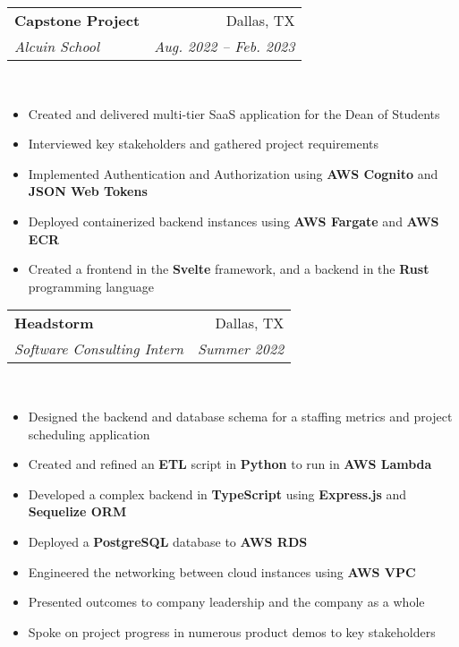 \documentclass[letterpaper, 12pt]{article}
\makeatletter
\newcommand{\resumeSubheading}[4]{
    \vspace{-1pt}
    \begin{tabular*}{\textwidth}[t]{l@{\extracolsep{\fill}}r}
        \textbf{#1} & #2 \\
        \textit{\small#3} & \textit{\small #4} \\
    \end{tabular*}\vspace{-7pt}
}
\makeatother
\begin{document}
    \vspace{.2cm}
    \resumeSubheading
        {Capstone Project}{Dallas, TX}
        {Alcuin School}{Aug. 2022 -- Feb. 2023}\\

        \vspace*{.1cm}
        \begin{itemize}
            \itemsep-3pt
            \item Created and delivered multi-tier SaaS application for the Dean of Students
            \item Interviewed key stakeholders and gathered project requirements
            \item Implemented Authentication and Authorization using \textbf{AWS Cognito} and \textbf{JSON Web Tokens}
            \item Deployed containerized backend instances using \textbf{AWS Fargate} and \textbf{AWS ECR}
            \item Created a frontend in the \textbf{Svelte} framework, and a backend in the \textbf{Rust} programming language
        \end{itemize}

    \vspace{.2cm}
    \resumeSubheading
        {Headstorm}{Dallas, TX}
        {Software Consulting Intern}{Summer 2022}\\

        \vspace*{.1cm}
        \begin{itemize}
            \itemsep-3pt
            \item Designed the backend and database schema for a staffing metrics and project scheduling application
            \item Created and refined an \textbf{ETL} script in \textbf{Python} to run in \textbf{AWS Lambda}
            \item Developed a complex backend in \textbf{TypeScript} using \textbf{Express.js} and \textbf{Sequelize ORM}
            \item Deployed a \textbf{PostgreSQL} database to \textbf{AWS RDS}
            \item Engineered the networking between cloud instances using \textbf{AWS VPC}
            \item Presented outcomes to company leadership and the company as a whole
            \item Spoke on project progress in numerous product demos to key stakeholders
        \end{itemize}
\end{document}
